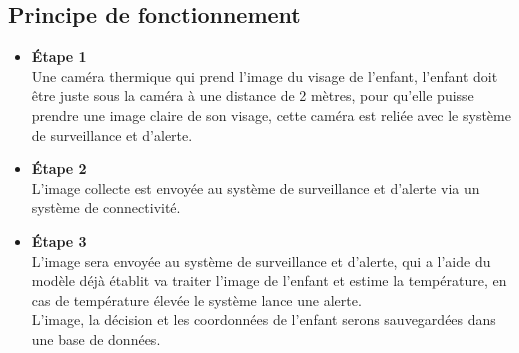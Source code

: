 \documentclass[12pt]{article}
\begin{document}
\subsection{Principe de fonctionnement}
\begin{itemize}
	\item \textbf{Étape 1}\\
	Une caméra thermique qui prend l'image du visage de l'enfant, l'enfant doit être juste sous la caméra à une distance de 2 mètres, pour qu’elle puisse prendre une image claire de son visage, cette caméra est reliée avec le système de surveillance et d'alerte.
	\item \textbf{Étape 2}\\
	L'image collecte est envoyée au système de surveillance et d'alerte via un système de connectivité.
	\item \textbf{Étape 3}\\
	L'image sera envoyée  au système de surveillance et d'alerte, qui a l'aide du modèle déjà établit va traiter l'image de l’enfant et estime la température, en cas de température élevée le système lance une alerte.\\
	L'image, la décision et les coordonnées de l'enfant serons sauvegardées dans une base de données.
\end{itemize}
\end{document}
